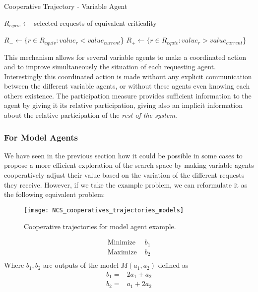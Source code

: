 \begin{algorithm}
\caption{Cooperative Trajectory - Variable Agent}
\label{algo_cooperative_trajectory_variable}
	$R_{equiv} \leftarrow$ selected requests of equivalent criticality\;
	
		$R_- \leftarrow \{r \in R_{equiv} : value_{r} < value_{current}$\}\;
		$R_+ \leftarrow \{r \in R_{equiv} : value_{r} > value_{current}$\}\;
		
\end{algorithm}

This mechanism allows for several variable agents to make a coordinated action and to improve simultaneously the situation of each requesting agent. Interestingly this coordinated action is made without any explicit communication between the different variable agents, or without these agents even knowing each others existence. The participation measure provides sufficient information to the agent by giving it its relative participation, giving also an implicit information about the relative participation of the \emph{rest of the system}.


\subsubsection{For Model Agents}

We have seen in the previous section how it could be possible in some cases to propose a more efficient exploration of the search space by making variable agents cooperatively adjust their value based on the variation of the different requests they receive. However, if we take the example problem, we can reformulate it as the following equivalent problem:

\begin{figure}
\centering
\texttt{[image: NCS\_cooperatives\_trajectories\_models]}
\caption{Cooperative trajectories for model agent example.}\label{NCS_cooperatives_trajectories_models}
\end{figure}

\begin{align*}
\text{Minimize } &b_1\\
\text{Maximize } &b_2\\
\end{align*}
Where $b_1,b_2$ are outputs of the model $M(a_1,a_2)$ defined as
\begin{align*}
b_1 = &2a_1 + a_2\\
b_2 = &a_1 + 2a_2\\
\end{align*}

